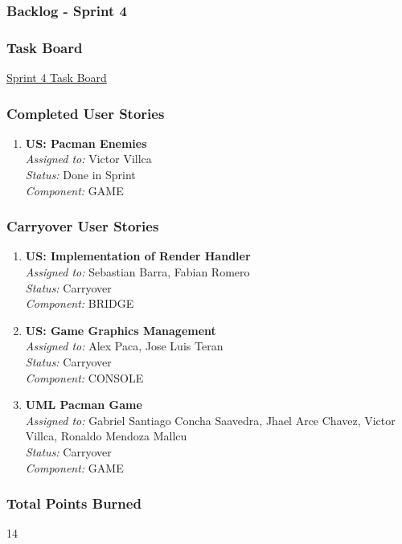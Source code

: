 \subsubsection*{Backlog - Sprint 4}
\subsubsection*{Task Board}
\href{https://tree.taiga.io/project/joseluis-teran-coffeetime/taskboard/sprint-4-6137}{Sprint 4 Task Board}

\subsubsection*{Completed User Stories}

\begin{enumerate}
    \item \textbf{US: Pacman Enemies} \\
    \textit{Assigned to:} Victor Villca \\
    \textit{Status:} Done in Sprint \\
    \textit{Component:} GAME
\end{enumerate}

\subsubsection*{Carryover User Stories}

\begin{enumerate}
    \item \textbf{US: Implementation of Render Handler} \\
    \textit{Assigned to:} Sebastian Barra, Fabian Romero \\
    \textit{Status:} Carryover \\
    \textit{Component:} BRIDGE
    \item \textbf{US: Game Graphics Management} \\
    \textit{Assigned to:} Alex Paca, Jose Luis Teran \\
    \textit{Status:} Carryover \\
    \textit{Component:} CONSOLE
    \item \textbf{UML Pacman Game} \\
    \textit{Assigned to:} Gabriel Santiago Concha Saavedra, Jhael Arce Chavez, Victor Villca, Ronaldo Mendoza Mallcu \\
    \textit{Status:} Carryover \\
    \textit{Component:} GAME
\end{enumerate}

\subsubsection*{Total Points Burned}
14